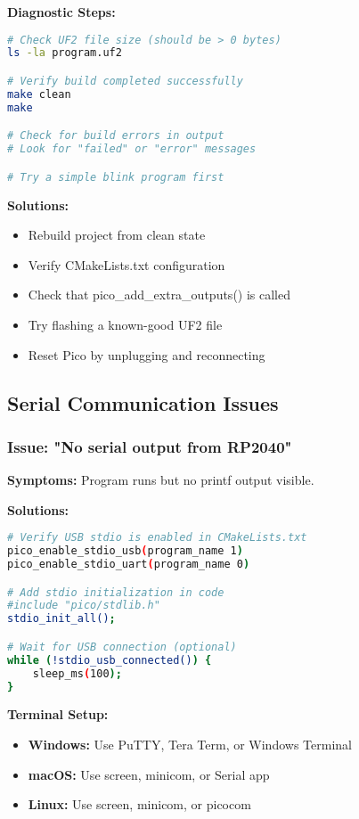 \documentclass[11pt,a4paper]{article}
\begin{document}
\textbf{Diagnostic Steps:}
\begin{lstlisting}[language=bash]
# Check UF2 file size (should be > 0 bytes)
ls -la program.uf2

# Verify build completed successfully
make clean
make

# Check for build errors in output
# Look for "failed" or "error" messages

# Try a simple blink program first
\end{lstlisting}

\textbf{Solutions:}
\begin{itemize}
    \item Rebuild project from clean state
    \item Verify CMakeLists.txt configuration
    \item Check that pico\_add\_extra\_outputs() is called
    \item Try flashing a known-good UF2 file
    \item Reset Pico by unplugging and reconnecting
\end{itemize}

\subsection{Serial Communication Issues}

\subsubsection{Issue: "No serial output from RP2040"}
\textbf{Symptoms:} Program runs but no printf output visible.

\textbf{Solutions:}
\begin{lstlisting}[language=bash]
# Verify USB stdio is enabled in CMakeLists.txt
pico_enable_stdio_usb(program_name 1)
pico_enable_stdio_uart(program_name 0)

# Add stdio initialization in code
#include "pico/stdlib.h"
stdio_init_all();

# Wait for USB connection (optional)
while (!stdio_usb_connected()) {
    sleep_ms(100);
}
\end{lstlisting}

\textbf{Terminal Setup:}
\begin{itemize}
    \item \textbf{Windows:} Use PuTTY, Tera Term, or Windows Terminal
    \item \textbf{macOS:} Use screen, minicom, or Serial app
    \item \textbf{Linux:} Use screen, minicom, or picocom
\end{itemize}
\end{document}
